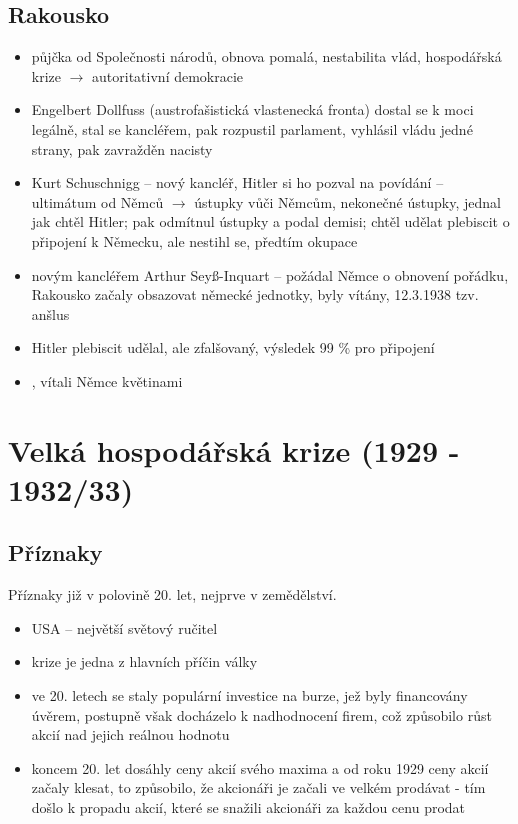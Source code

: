 \documentclass{article}
\begin{document}
\subsection*{Rakousko}
\begin{itemize}
    \item půjčka od Společnosti národů, obnova pomalá, nestabilita vlád, hospodářská krize $\rightarrow$ autoritativní demokracie
    \item Engelbert Dollfuss (austrofašistická vlastenecká fronta) dostal se k moci legálně, stal se kancléřem, pak rozpustil parlament, vyhlásil vládu jedné strany, pak zavražděn nacisty
    \item Kurt Schuschnigg -- nový kancléř, Hitler si ho pozval na povídání -- ultimátum od Němců $\rightarrow$ ústupky vůči Němcům, nekonečné ústupky, jednal jak chtěl Hitler; pak odmítnul ústupky a podal demisi; chtěl udělat plebiscit o připojení k Německu, ale nestihl se, předtím okupace
    \item novým kancléřem Arthur Seyß-Inquart -- požádal Němce o obnovení pořádku, Rakousko začaly obsazovat německé jednotky, byly vítány, 12.3.1938 tzv. anšlus
    \item Hitler plebiscit udělal, ale zfalšovaný, výsledek 99 \% pro připojení
    \item {}, vítali Němce květinami
\end{itemize}

\section*{Velká hospodářská krize (1929 - 1932/33)}

\subsection*{Příznaky}
Příznaky již v polovině 20. let, nejprve v zemědělství.
\begin{itemize}
    \item USA – největší světový ručitel
    \item krize je jedna z hlavních příčin války
    \item ve 20. letech se staly populární investice na burze, jež byly financovány úvěrem, postupně však docházelo k nadhodnocení firem, což způsobilo růst akcií nad jejich reálnou hodnotu
    \item koncem 20. let dosáhly ceny akcií svého maxima a od roku 1929 ceny akcií začaly klesat, to způsobilo, že akcionáři je začali ve velkém prodávat - tím došlo k propadu akcií, které se snažili akcionáři za každou cenu prodat
\end{itemize}
\end{document}
